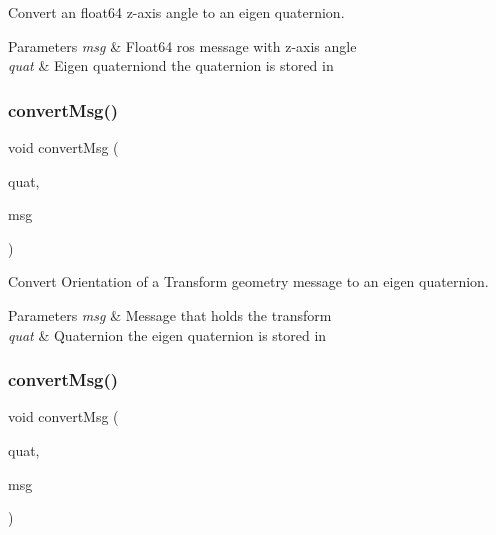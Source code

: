 Convert an float64 z-\/axis angle to an eigen quaternion. 


\begin{DoxyParams}{Parameters}
{\em msg} & Float64 ros message with z-\/axis angle \\
\hline
{\em quat} & Eigen quaterniond the quaternion is stored in \\
\hline
\end{DoxyParams}
\mbox{\label{group__transport__controller_gad42169e0be94216cd31a8a360a848155}} 
\subsubsection{\texorpdfstring{convert\+Msg()}{convertMsg()}\hspace{0.1cm}{\footnotesize\ttfamily [2/13]}}
{\footnotesize\ttfamily void convert\+Msg (\begin{DoxyParamCaption}\item[{Eigen\+::\+Quaterniond \&}]{quat,  }\item[{geometry\+\_\+msgs\+::\+Transform \&}]{msg }\end{DoxyParamCaption})}



Convert Orientation of a Transform geometry message to an eigen quaternion. 


\begin{DoxyParams}{Parameters}
{\em msg} & Message that holds the transform \\
\hline
{\em quat} & Quaternion the eigen quaternion is stored in \\
\hline
\end{DoxyParams}
\mbox{\label{group__transport__controller_ga34987bf2293cc8aa5fac7ac60e6510ef}} 
\subsubsection{\texorpdfstring{convert\+Msg()}{convertMsg()}\hspace{0.1cm}{\footnotesize\ttfamily [3/13]}}
{\footnotesize\ttfamily void convert\+Msg (\begin{DoxyParamCaption}\item[{Eigen\+::\+Quaterniond \&}]{quat,  }\item[{geometry\+\_\+msgs\+::\+Transform\+Stamped \&}]{msg }\end{DoxyParamCaption})}




